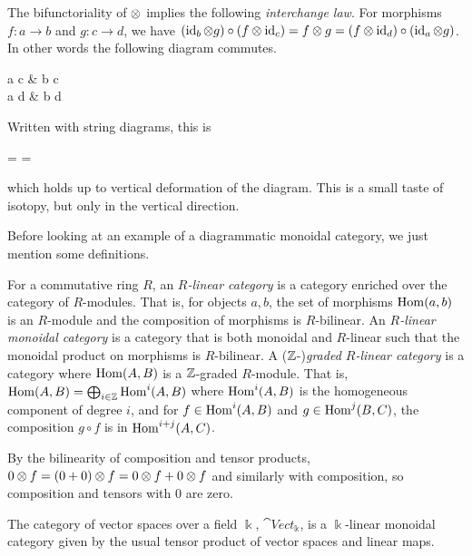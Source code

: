 The bifunctoriality of $\otimes$ implies the following \textit{interchange law}. For morphisms $f: a \to b$ and $g: c \to d$, we have $(\operatorname{id}_b \otimes g) \circ (f \otimes \operatorname{id}_c) = f \otimes g = (f \otimes \operatorname{id}_d) \circ (\operatorname{id}_a \otimes g)$. In other words the following diagram commutes.

\begin{center}
    \begin{mytikzcd}[sep=large]
        a \tensor c \arrow[r,"f \tensor \id_c"] \arrow[d, "\id_a \tensor g"'] \arrow[dr, "f \tensor g"]
        & b \tensor c \arrow[d, "\id_b \tensor g"] \\
        a \tensor d \arrow[r,"f \tensor \id_d"]
        & b \tensor d
    \end{mytikzcd}
\end{center}
Written with string diagrams, this is
\begin{center}
    = 
    = 
\end{center}
which holds up to vertical deformation of the diagram. This is a small taste of isotopy, but only in the vertical direction.

Before looking at an example of a diagrammatic monoidal category, we just mention some definitions.

\begin{definition}
    For a commutative ring $R$, an \textit{$R$-linear category} is a category enriched over the category of $R$-modules. That is, for objects $a,b$, the set of morphisms $\operatorname{Hom}(a,b)$ is an $R$-module and the composition of morphisms is $R$-bilinear. An \textit{$R$-linear monoidal category} is a category that is both monoidal and $R$-linear such that the monoidal product on morphisms is $R$-bilinear. A ($\mathbb{Z}$-)\textit{graded $R$-linear category} is a category where $\operatorname{Hom}(A,B)$ is a $\mathbb{Z}$-graded $R$-module. That is, $\operatorname{Hom}(A,B) = \bigoplus_{i \in \mathbb{Z}} \operatorname{Hom}^i(A,B)$ where $\operatorname{Hom}^i(A,B)$ is the homogeneous component of degree $i$, and for $f \in \operatorname{Hom}^i(A,B)$ and $g \in \operatorname{Hom}^j(B,C)$, the composition $g \circ f$ is in $\operatorname{Hom}^{i+j}(A,C)$.
\end{definition}

By the bilinearity of composition and tensor products, $0 \otimes f = (0 + 0) \otimes f = 0 \otimes f + 0 \otimes f$ and similarly with composition, so composition and tensors with $0$ are zero.

\begin{example}
    The category of vector spaces over a field $\Bbbk$, $\cat{Vect}_\Bbbk$, is a $\Bbbk$-linear monoidal category given by the usual tensor product of vector spaces and linear maps.
\end{example}

